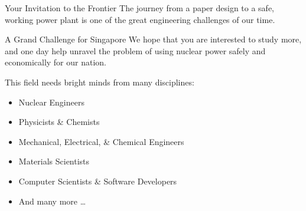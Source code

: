 \documentclass[aspectratio=169]{beamer}
\begin{document}

\begin{frame}[allowframebreaks]{Your Invitation to the Frontier}
    The journey from a paper design to a safe, working power plant is one of the great engineering challenges of our time.
    
    \vspace{1.5em}
    
    \begin{alertblock}{A Grand Challenge for Singapore}
        We hope that you are interested to study more, and one day help unravel the problem of using nuclear power safely and economically for our nation.
    \end{alertblock}
    
    \vspace{1.5em}
    This field needs bright minds from many disciplines:
    \begin{itemize}
        \item Nuclear Engineers 
        \item Physicists \& Chemists
        \item Mechanical, Electrical, \& Chemical Engineers
        \item Materials Scientists
        \item Computer Scientists \& Software Developers
        \item And many more \dots
    \end{itemize}
\end{frame}
\end{document}
